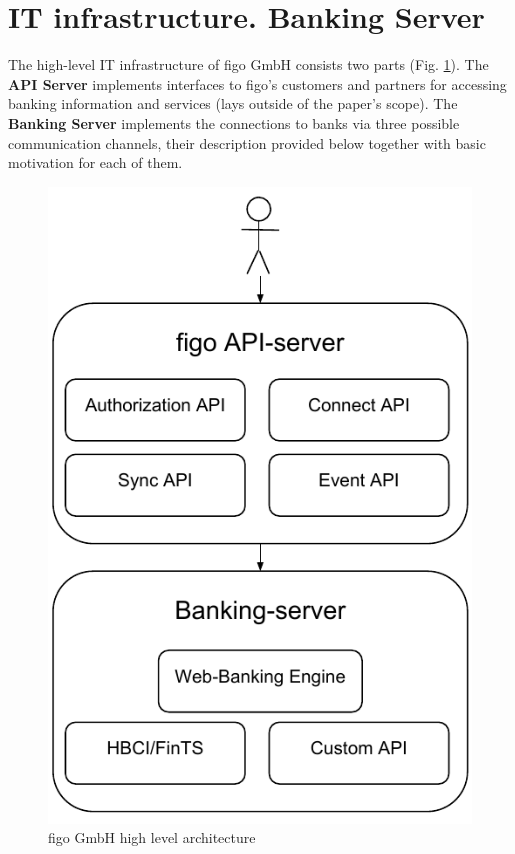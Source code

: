 \section{IT infrastructure. Banking Server}
\label{sec:infrastructure}
The high-level IT infrastructure of figo GmbH consists two parts (Fig. \ref{fig:figoArch}). The \textbf{API Server} implements interfaces to figo's customers and partners for accessing banking information and services (lays outside of the paper's scope). The \textbf{Banking Server} implements the connections to banks via three possible communication channels, their description provided below together with basic motivation for each of them.
\begin{figure}[ht]
  	\label{fig:figoArch}
    \centering
    \includegraphics[scale=0.7]{grafiken/figoArch}
     \caption{figo GmbH high level architecture}
\end{figure}

